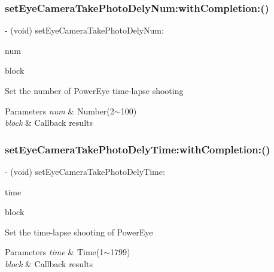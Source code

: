 \subsubsection{\texorpdfstring{set\+Eye\+Camera\+Take\+Photo\+Dely\+Num\+:with\+Completion\+:()}{setEyeCameraTakePhotoDelyNum:withCompletion:()}}
{\footnotesize\ttfamily -\/ (void) set\+Eye\+Camera\+Take\+Photo\+Dely\+Num\+: \begin{DoxyParamCaption}\item[{(N\+S\+Integer)}]{num }\item[{withCompletion:(P\+V\+Completion\+Block)}]{block }\end{DoxyParamCaption}}

Set the number of Power\+Eye time-\/lapse shooting


\begin{DoxyParams}{Parameters}
{\em num} & Number(2$\sim$100) \\
\hline
{\em block} & Callback results \\
\hline
\end{DoxyParams}
\mbox{\label{interface_p_v_eye_camera_abdc54101661d7172481a7f70e67dd3c2}} 
\subsubsection{\texorpdfstring{set\+Eye\+Camera\+Take\+Photo\+Dely\+Time\+:with\+Completion\+:()}{setEyeCameraTakePhotoDelyTime:withCompletion:()}}
{\footnotesize\ttfamily -\/ (void) set\+Eye\+Camera\+Take\+Photo\+Dely\+Time\+: \begin{DoxyParamCaption}\item[{(N\+S\+Integer)}]{time }\item[{withCompletion:(P\+V\+Completion\+Block)}]{block }\end{DoxyParamCaption}}

Set the time-\/lapse shooting of Power\+Eye


\begin{DoxyParams}{Parameters}
{\em time} & Time(1$\sim$1799) \\
\hline
{\em block} & Callback results \\
\hline
\end{DoxyParams}
\mbox{\label{interface_p_v_eye_camera_aac5592563aaba1046574f5fb1e596176}} 
